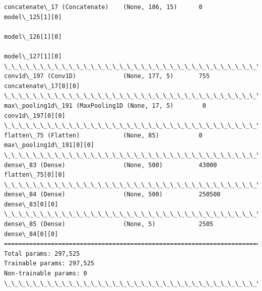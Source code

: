\documentclass[11pt]{article}
\begin{document}
\begin{Verbatim}[commandchars=\\\{\}]
concatenate\_17 (Concatenate)    (None, 186, 15)      0           model\_125[1][0]                  
                                                                 model\_126[1][0]                  
                                                                 model\_127[1][0]                  
\_\_\_\_\_\_\_\_\_\_\_\_\_\_\_\_\_\_\_\_\_\_\_\_\_\_\_\_\_\_\_\_\_\_\_\_\_\_\_\_\_\_\_\_\_\_\_\_\_\_\_\_\_\_\_\_\_\_\_\_\_\_\_\_\_\_\_\_\_\_\_\_\_\_\_\_\_\_\_\_\_\_\_\_\_\_\_\_\_\_\_\_\_\_\_\_\_\_
conv1d\_197 (Conv1D)             (None, 177, 5)       755         concatenate\_17[0][0]             
\_\_\_\_\_\_\_\_\_\_\_\_\_\_\_\_\_\_\_\_\_\_\_\_\_\_\_\_\_\_\_\_\_\_\_\_\_\_\_\_\_\_\_\_\_\_\_\_\_\_\_\_\_\_\_\_\_\_\_\_\_\_\_\_\_\_\_\_\_\_\_\_\_\_\_\_\_\_\_\_\_\_\_\_\_\_\_\_\_\_\_\_\_\_\_\_\_\_
max\_pooling1d\_191 (MaxPooling1D (None, 17, 5)        0           conv1d\_197[0][0]                 
\_\_\_\_\_\_\_\_\_\_\_\_\_\_\_\_\_\_\_\_\_\_\_\_\_\_\_\_\_\_\_\_\_\_\_\_\_\_\_\_\_\_\_\_\_\_\_\_\_\_\_\_\_\_\_\_\_\_\_\_\_\_\_\_\_\_\_\_\_\_\_\_\_\_\_\_\_\_\_\_\_\_\_\_\_\_\_\_\_\_\_\_\_\_\_\_\_\_
flatten\_75 (Flatten)            (None, 85)           0           max\_pooling1d\_191[0][0]          
\_\_\_\_\_\_\_\_\_\_\_\_\_\_\_\_\_\_\_\_\_\_\_\_\_\_\_\_\_\_\_\_\_\_\_\_\_\_\_\_\_\_\_\_\_\_\_\_\_\_\_\_\_\_\_\_\_\_\_\_\_\_\_\_\_\_\_\_\_\_\_\_\_\_\_\_\_\_\_\_\_\_\_\_\_\_\_\_\_\_\_\_\_\_\_\_\_\_
dense\_83 (Dense)                (None, 500)          43000       flatten\_75[0][0]                 
\_\_\_\_\_\_\_\_\_\_\_\_\_\_\_\_\_\_\_\_\_\_\_\_\_\_\_\_\_\_\_\_\_\_\_\_\_\_\_\_\_\_\_\_\_\_\_\_\_\_\_\_\_\_\_\_\_\_\_\_\_\_\_\_\_\_\_\_\_\_\_\_\_\_\_\_\_\_\_\_\_\_\_\_\_\_\_\_\_\_\_\_\_\_\_\_\_\_
dense\_84 (Dense)                (None, 500)          250500      dense\_83[0][0]                   
\_\_\_\_\_\_\_\_\_\_\_\_\_\_\_\_\_\_\_\_\_\_\_\_\_\_\_\_\_\_\_\_\_\_\_\_\_\_\_\_\_\_\_\_\_\_\_\_\_\_\_\_\_\_\_\_\_\_\_\_\_\_\_\_\_\_\_\_\_\_\_\_\_\_\_\_\_\_\_\_\_\_\_\_\_\_\_\_\_\_\_\_\_\_\_\_\_\_
dense\_85 (Dense)                (None, 5)            2505        dense\_84[0][0]                   
==================================================================================================
Total params: 297,525
Trainable params: 297,525
Non-trainable params: 0
\_\_\_\_\_\_\_\_\_\_\_\_\_\_\_\_\_\_\_\_\_\_\_\_\_\_\_\_\_\_\_\_\_\_\_\_\_\_\_\_\_\_\_\_\_\_\_\_\_\_\_\_\_\_\_\_\_\_\_\_\_\_\_\_\_\_\_\_\_\_\_\_\_\_\_\_\_\_\_\_\_\_\_\_\_\_\_\_\_\_\_\_\_\_\_\_\_\_

    \end{Verbatim}
\end{document}

